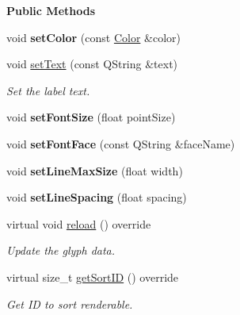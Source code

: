\begin{Indent}\textbf{ Public Methods}\par
\begin{DoxyCompactItemize}
\item 
\mbox{\label{classrev_1_1_label_a6f013b10f0fc0d9d38c97293392e498e}} 
void {\bfseries set\+Color} (const \mbox{\hyperlink{classrev_1_1_color}{Color}} \&color)
\item 
\mbox{\label{classrev_1_1_label_a24518623c5b47e013fcb6b1f1ebe3cc4}} 
void \mbox{\hyperlink{classrev_1_1_label_a24518623c5b47e013fcb6b1f1ebe3cc4}{set\+Text}} (const Q\+String \&text)
\begin{DoxyCompactList}\small\item\em Set the label text. \end{DoxyCompactList}\item 
\mbox{\label{classrev_1_1_label_a16e88a8662254c6886b96100d5ed314e}} 
void {\bfseries set\+Font\+Size} (float point\+Size)
\item 
\mbox{\label{classrev_1_1_label_a4290de4c901db0f440c6f9050fb9332f}} 
void {\bfseries set\+Font\+Face} (const Q\+String \&face\+Name)
\item 
\mbox{\label{classrev_1_1_label_a95ce6c76e0f876a359245f7a23c0594f}} 
void {\bfseries set\+Line\+Max\+Size} (float width)
\item 
\mbox{\label{classrev_1_1_label_a9bf7a176b7a5dda177000a1c15a297b4}} 
void {\bfseries set\+Line\+Spacing} (float spacing)
\item 
\mbox{\label{classrev_1_1_label_ab32773f4ee881a3041bfbc0ba36137d7}} 
virtual void \mbox{\hyperlink{classrev_1_1_label_ab32773f4ee881a3041bfbc0ba36137d7}{reload}} () override
\begin{DoxyCompactList}\small\item\em Update the glyph data. \end{DoxyCompactList}\item 
\mbox{\label{classrev_1_1_label_a5f92c283900aa5b274fdcb25f5fd8f84}} 
virtual size\+\_\+t \mbox{\hyperlink{classrev_1_1_label_a5f92c283900aa5b274fdcb25f5fd8f84}{get\+Sort\+ID}} () override
\begin{DoxyCompactList}\small\item\em Get ID to sort renderable. \end{DoxyCompactList}\end{DoxyCompactItemize}
\end{Indent}
